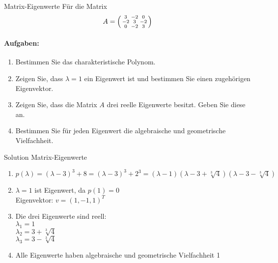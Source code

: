 \begin{example2}{Matrix-Eigenwerte}
Für die Matrix
$$A = \begin{psmallmatrix}
3 & -2 & 0\\
-2 & 3 & -2\\
0 & -2 & 3
\end{psmallmatrix}$$

\paragraph{Aufgaben:}
\begin{enumerate}
    \item Bestimmen Sie das charakteristische Polynom.
    
    \item Zeigen Sie, dass $\lambda = 1$ ein Eigenwert ist und bestimmen Sie einen zugehörigen Eigenvektor.
    
    \item Zeigen Sie, dass die Matrix $A$ drei reelle Eigenwerte besitzt. Geben Sie diese an.
    
    \item Bestimmen Sie für jeden Eigenwert die algebraische und geometrische Vielfachheit.
\end{enumerate}
\end{example2}

\begin{KR}{Solution Matrix-Eigenwerte}
\begin{enumerate}
    \item $p(\lambda) = (\lambda-3)^3 + 8 = (\lambda-3)^3 + 2^3 = (\lambda-1)(\lambda-3+\sqrt[3]{4})(\lambda-3-\sqrt[3]{4})$
    
    \item $\lambda = 1$ ist Eigenwert, da $p(1) = 0$\\
    Eigenvektor: $v = (1,-1,1)^T$
    
    \item Die drei Eigenwerte sind reell:\\
    $\lambda_1 = 1$\\
    $\lambda_2 = 3+\sqrt[3]{4}$\\
    $\lambda_3 = 3-\sqrt[3]{4}$
    
    \item Alle Eigenwerte haben algebraische und geometrische Vielfachheit 1
\end{enumerate}
\end{KR}

